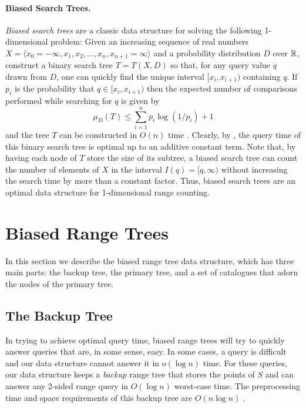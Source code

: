 \documentclass[lotsofwhite,charterfonts]{patmorin}
\begin{document}
\paragraph{Biased Search Trees.}

\emph{Biased search trees} are a classic data structure for solving
the following 1-dimensional problem:  Given an increasing sequence of
real numbers $X=\langle x_0=-\infty,x_1,x_2,\ldots ,
x_n,x_{n+1}=\infty\rangle$ and a probability distribution $D$ over
$\mathbb{R}$, construct a binary search tree  $T=T(X,D)$ so that, for any
query value $q$ drawn from $D$, one can quickly find the unique
interval $[x_i,x_{i+1})$ containing $q$.  If $p_i$ is the probability
that $q\in[x_i,x_{i+1})$ then the expected number of comparisons
performed while searching for $q$ is given
by
\[
   \mu_D(T) \le \sum_{i=1}^{n} p_i\log(1/p_i) + 1 
\]
and the tree $T$ can be constructed in $O(n)$ time \cite{m75}.
Clearly, by , the query time of this binary search
tree is optimal up to an additive constant term.  Note that, by having
each node of $T$ store the size of its subtree, a biased search tree
can count the number of elements of $X$ in the interval
$I(q)=[q,\infty)$ without increasing the search time by more than a
constant factor.  Thus, biased search trees are an optimal data
structure for 1-dimensional range counting.

\section{Biased Range Trees}

In this section we describe the biased range tree data structure,
which has three main parts: the backup tree, the primary tree, and a
set of catalogues that adorn the nodes of the primary tree.

\subsection{The Backup Tree}

In trying to achieve optimal query time, biased range trees will try
to quickly answer queries that are, in some sense, easy.  In some
cases, a query is difficult and our data structure cannot answer it
in $o(\log n)$ time.  For these queries, our data structure keeps a
\emph{backup} range tree that stores the points of $S$ and can answer
any 2-sided range query in $O(\log n)$ worst-case time.  The
preprocessing time and space requirements of this backup tree are
$O(n\log n)$ \cite{bkos97}.
\end{document}
